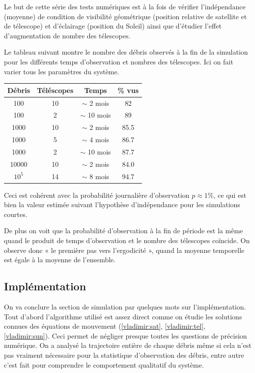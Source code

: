 Le but de cette s\'erie des tests num\'eriques est \`a la fois de v\'erifier 
l'ind\'ependance (moyenne) de condition de visibilit\'e g\'eom\'etrique (position
relative de satellite et de t\'elescope) et d'\'eclairage (position
du Soleil) ainsi que d'\'etudier l'effet d'augmentation de nombre des
t\'elescopes. 

Le tableau suivant montre le nombre des d\'ebris observ\'es
\`a la fin de la simulation pour les diff\'erents temps d'observation et nombres des
t\'elescopes. Ici on fait varier tous les param\`etres du syst\`eme.

\begin{center}
\begin{tabular}{|c|c|c|c|} \hline
 D\'ebris & T\'el\'escopes & Temps & \% vus \\ 
 \hline \hline
 100 & 10 & $\sim$ 2 mois &82 \\
 \hline
 100 & 2 & $\sim$ 10 mois &89 \\
 \hline
 \hline
 1000 & 10 & $\sim$ 2 mois &85.5 \\
 \hline
 1000 & 5 & $\sim$ 4 mois &86.7 \\
 \hline
 1000 & 2 & $\sim$ 10 mois &87.7 \\
 \hline  
 \hline
 10000 & 10 & $\sim$ 2 mois &84.0 \\
 \hline
 \hline
 $10^5$ & 14 & $\sim$ 8 mois &  94.7 \\
 \hline
\end{tabular} 
\end{center}
Ceci est coh\'erent avec la probabilit\'e journali\`ere d'observation 
   $p \approx 1\%$, ce qui est bien la valeur estim\'ee suivant l'hypoth\`ese 
   d'ind\'ependance pour les simulations courtes. 
   
   De plus on voit que la probabilit\'e d'observation \`a la fin de p\'eriode
   est la m\^eme quand le produit de temps d'observation et le nombre des t\'elescopes
   coïncide. On observe donc « le premi\`ere pas vers l'ergodicit\'e », quand la moyenne 
   temporelle est \'egale \`a la moyenne de l'ensemble. 
   
   \subsection{Impl\'ementation}
On va conclure la section de simulation par quelques mots sur l'impl\'ementation.
Tout d'abord l'algorithme utilis\'e est assez direct comme on \'etudie les solutions 
connues des \'equations de mouvement (\ref{vladimir:sat}, \ref{vladimir:tel}, \ref{vladimir:sun}). Ceci permet de n\'egliger presque toutes les questions
de pr\'ecision num\'erique. On a analys\'e la trajectoire enti\`ere de chaque d\'ebris m\^eme si cela n'est pas vraiment 
n\'ecessaire pour la statistique d'observation des d\'ebris, entre autre c'est fait pour comprendre 
le comportement qualitatif du syst\`eme. 

